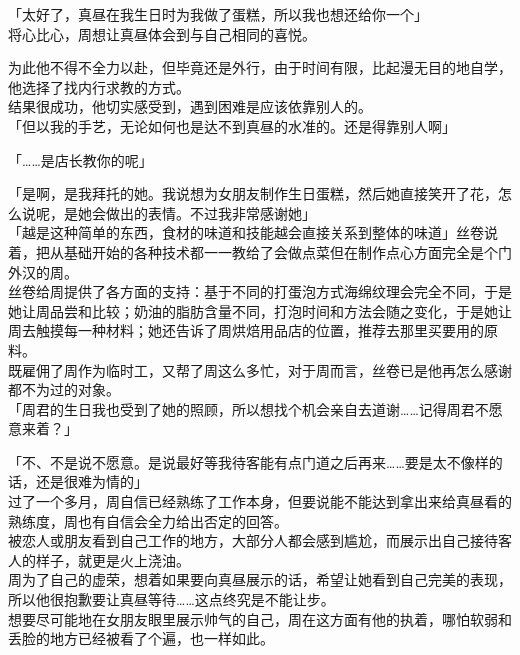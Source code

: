 「太好了，真昼在我生日时为我做了蛋糕，所以我也想还给你一个」\\

将心比心，周想让真昼体会到与自己相同的喜悦。

为此他不得不全力以赴，但毕竟还是外行，由于时间有限，比起漫无目的地自学，他选择了找内行求教的方式。\\

结果很成功，他切实感受到，遇到困难是应该依靠别人的。\\

「但以我的手艺，无论如何也是达不到真昼的水准的。还是得靠别人啊」

「……是店长教你的呢」

「是啊，是我拜托的她。我说想为女朋友制作生日蛋糕，然后她直接笑开了花，怎么说呢，是她会做出的表情。不过我非常感谢她」\\

「越是这种简单的东西，食材的味道和技能越会直接关系到整体的味道」丝卷说着，把从基础开始的各种技术都一一教给了会做点菜但在制作点心方面完全是个门外汉的周。\\

丝卷给周提供了各方面的支持：基于不同的打蛋泡方式海绵纹理会完全不同，于是她让周品尝和比较；奶油的脂肪含量不同，打泡时间和方法会随之变化，于是她让周去触摸每一种材料；她还告诉了周烘焙用品店的位置，推荐去那里买要用的原料。\\

既雇佣了周作为临时工，又帮了周这么多忙，对于周而言，丝卷已是他再怎么感谢都不为过的对象。\\

「周君的生日我也受到了她的照顾，所以想找个机会亲自去道谢……记得周君不愿意来着？」

「不、不是说不愿意。是说最好等我待客能有点门道之后再来……要是太不像样的话，还是很难为情的」\\

过了一个多月，周自信已经熟练了工作本身，但要说能不能达到拿出来给真昼看的熟练度，周也有自信会全力给出否定的回答。\\

被恋人或朋友看到自己工作的地方，大部分人都会感到尴尬，而展示出自己接待客人的样子，就更是火上浇油。\\

周为了自己的虚荣，想着如果要向真昼展示的话，希望让她看到自己完美的表现，所以他很抱歉要让真昼等待……这点终究是不能让步。\\

想要尽可能地在女朋友眼里展示帅气的自己，周在这方面有他的执着，哪怕软弱和丢脸的地方已经被看了个遍，也一样如此。\\

